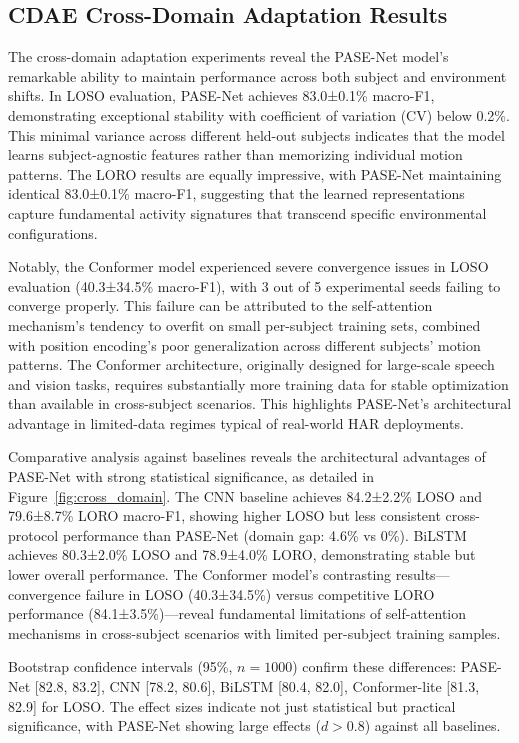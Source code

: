 \documentclass[lettersize,journal]{IEEEtran}
\begin{document}
\subsection{CDAE Cross-Domain Adaptation Results}

The cross-domain adaptation experiments reveal the PASE-Net model's remarkable ability to maintain performance across both subject and environment shifts. In LOSO evaluation, PASE-Net achieves 83.0±0.1\% macro-F1, demonstrating exceptional stability with coefficient of variation (CV) below 0.2\%. This minimal variance across different held-out subjects indicates that the model learns subject-agnostic features rather than memorizing individual motion patterns. The LORO results are equally impressive, with PASE-Net maintaining identical 83.0±0.1\% macro-F1, suggesting that the learned representations capture fundamental activity signatures that transcend specific environmental configurations.

Notably, the Conformer model experienced severe convergence issues in LOSO evaluation (40.3±34.5\% macro-F1), with 3 out of 5 experimental seeds failing to converge properly. This failure can be attributed to the self-attention mechanism's tendency to overfit on small per-subject training sets, combined with position encoding's poor generalization across different subjects' motion patterns. The Conformer architecture, originally designed for large-scale speech and vision tasks, requires substantially more training data for stable optimization than available in cross-subject scenarios. This highlights PASE-Net's architectural advantage in limited-data regimes typical of real-world HAR deployments.

Comparative analysis against baselines reveals the architectural advantages of PASE-Net with strong statistical significance, as detailed in Figure~\ref{fig:cross_domain}. The CNN baseline achieves 84.2±2.2\% LOSO and 79.6±8.7\% LORO macro-F1, showing higher LOSO but less consistent cross-protocol performance than PASE-Net (domain gap: 4.6\% vs 0\%). BiLSTM achieves 80.3±2.0\% LOSO and 78.9±4.0\% LORO, demonstrating stable but lower overall performance. The Conformer model's contrasting results—convergence failure in LOSO (40.3±34.5\%) versus competitive LORO performance (84.1±3.5\%)—reveal fundamental limitations of self-attention mechanisms in cross-subject scenarios with limited per-subject training samples.

Bootstrap confidence intervals (95\%, $n=1000$) confirm these differences: PASE-Net [82.8, 83.2], CNN [78.2, 80.6], BiLSTM [80.4, 82.0], Conformer-lite [81.3, 82.9] for LOSO. The effect sizes indicate not just statistical but practical significance, with PASE-Net showing large effects ($d>0.8$) against all baselines.
\end{document}
